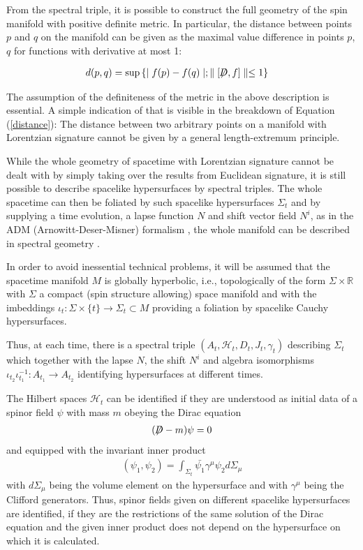 \documentclass[a4paper,10pt,oneside]{amsart}
\theoremstyle{plain}
\theoremstyle{definition}
\theoremstyle{remark}
\begin{document}
From the spectral triple, it is possible to construct the full
geometry of the spin manifold with positive definite metric. In
particular, the distance between points $p$ and $q$ on the
manifold can be given as the maximal value difference in points
$p$, $q$ for functions with derivative at most 1:


\begin{align}\label{distance}
  d(p,q) &= \sup{\{ \mid f(p)-f(q)\mid ;
  \parallel [\not\!\! D,f]\parallel \leq 1\} }
\end{align}


The assumption of the definiteness of the metric in the above
description is essential. A simple indication of that is visible
in the breakdown of Equation (\ref{distance}): The distance
between two arbitrary points on a manifold with Lorentzian
signature cannot be given by a general length-extremum principle.


While the whole geometry of spacetime with Lorentzian signature
cannot be dealt with by simply taking over the results from
Euclidean signature, it is still possible to describe spacelike
hypersurfaces by spectral triples. The whole spacetime can then be
foliated by such spacelike hypersurfaces ${\Sigma}_{t}$ and by
supplying a time evolution, a lapse function $N$ and shift vector
field ${N}^{i}$, as in the ADM (Arnowitt-Deser-Misner)
formalism \cite{MTW},
the whole manifold can be described in spectral geometry
\cite{Hawkins97}.


In order to avoid inessential technical problems, it will be
assumed that the spacetime manifold $M$ is globally hyperbolic,
i.e., topologically of the form $\Sigma\times\mathbb{R}$ with
$\Sigma$ a compact (spin structure allowing) space manifold and with
the imbeddings ${\iota}_{t}: \Sigma\times\{ t\} \rightarrow
{\Sigma}_{t}\subset M$ providing a foliation by spacelike Cauchy
hypersurfaces.


Thus, at each time, there is a spectral triple $({A}_{t},
{\mathcal{H}}_{t}, {D}_{t}, {J}_{t},{\gamma}_{t} )$ describing $
{\Sigma}_{t}$ which together with the lapse $N$, the shift
${N}^{i}$ and algebra isomorphisms
${\iota}_{{t}_{2}}{\iota}^{-1}_{{t}_{1}}:{A}_{{t}_{1}}\rightarrow
{A}_{{t}_{2}}$ identifying hypersurfaces at different times.


The Hilbert spaces ${\mathcal{H}_{t}}$ can be identified if they
are understood as initial data of a spinor field $\psi$ with mass
$m$ obeying the Dirac equation
\begin{align}\label{diraceq}
  (\not\!\! D -m)\psi = 0
\end{align}
and equipped with the invariant inner product
\begin{align}
  ({\psi}_{1},{\psi}_{2}) = \int_{{\Sigma}_{t}}
  {\bar{{\psi}_{1}}{\gamma}^{\mu}{\psi}_{2}{d\Sigma}_{\mu}}
\end{align}
with ${d\Sigma}_{\mu}$ being the volume element on the
hypersurface and with ${\gamma}^{\mu}$ being the Clifford
generators. Thus, spinor fields given on different spacelike
hypersurfaces are identified, if they are the restrictions of the
same solution of the Dirac equation and the given inner product
does not depend on the hypersurface on which it is calculated.
\end{document}

